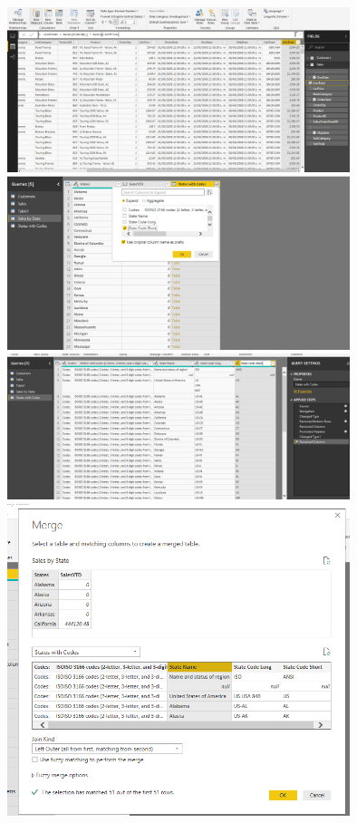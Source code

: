 \begin{center}
	\includegraphics[width=10cm]{./Imagenes/15.png}\\

	\includegraphics[width=10cm]{./Imagenes/16.png}\\

	\includegraphics[width=10cm]{./Imagenes/17.png}\\

	\includegraphics[width=10cm]{./Imagenes/18.png}\\
	\end{center}	




	


